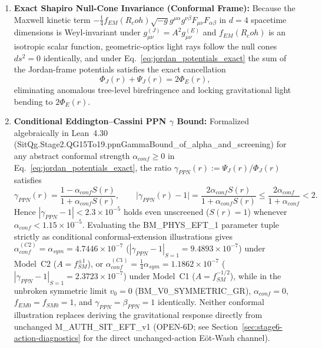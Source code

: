 \documentclass[american,11pt,letterpaper]{article}
\newcommand{\Rcoh}{R_{\mathrm{coh}}}
\def\mathrm#1{#1}%
\def\texttt#1{#1}%
\def\Rcoh{R_coh}%
\begin{document}
\begin{enumerate}[leftmargin=2em]
  \item \textbf{Exact Shapiro Null-Cone Invariance (Conformal Frame):} Because the Maxwell kinetic term $-\frac{1}{4}f_{\mathrm{EM}}(\Rcoh)\sqrt{-g}g^{\mu\alpha}g^{\nu\beta}F_{\mu\nu}F_{\alpha\beta}$ in $d=4$ spacetime dimensions is Weyl-invariant under $g_{\mu\nu}^{(J)} = A^2 g_{\mu\nu}^{(E)}$ and $f_{\mathrm{EM}}(\Rcoh)$ is an isotropic scalar function, geometric-optics light rays follow the null cones $ds^2 = 0$ identically, and under Eq.~\eqref{eq:jordan_potentials_exact} the sum of the Jordan-frame potentials satisfies the exact cancellation
  \begin{equation}
  \Phi_J(r) + \Psi_J(r) = 2\Phi_E(r),
  \label{eq:shapiro_null_cone_invariance}
  \end{equation}
  eliminating anomalous tree-level birefringence and locking gravitational light bending to $2\Phi_E(r)$.
  \item \textbf{Conditional Eddington--Cassini PPN $\gamma$ Bound:} Formalized algebraically in Lean~4.30 (\texttt{SitQg.Stage2.QG15To19.ppnGammaBound\_of\_alpha\_and\_screening}) for any abstract conformal strength $\alpha_{\mathrm{conf}} \ge 0$ in Eq.~\eqref{eq:jordan_potentials_exact}, the ratio $\gamma_{\mathrm{PPN}}(r) := \Psi_J(r)/\Phi_J(r)$ satisfies
  \begin{equation}
  \gamma_{\mathrm{PPN}}(r) = \frac{1 - \alpha_{\mathrm{conf}} S(r)}{1 + \alpha_{\mathrm{conf}} S(r)},
  \qquad
  \bigl|\gamma_{\mathrm{PPN}}(r) - 1\bigr|
  = \frac{2\alpha_{\mathrm{conf}} S(r)}{1 + \alpha_{\mathrm{conf}} S(r)}
  \le \frac{2\alpha_{\mathrm{conf}}}{1 + \alpha_{\mathrm{conf}}} < 2.
  \label{eq:gamma_ppn_exact_bound}
  \end{equation}
  Hence $|\gamma_{\mathrm{PPN}} - 1| < 2.3 \times 10^{-5}$ holds even unscreened ($S(r) = 1$) whenever $\alpha_{\mathrm{conf}} < 1.15 \times 10^{-5}$. Evaluating the \texttt{BM\_PHYS\_EFT\_1} parameter tuple strictly as conditional conformal-extension illustrations gives $\alpha_{\mathrm{conf}}^{(\mathrm{C2})} = \alpha_{\mathrm{sym}} = 4.7446\times 10^{-7}$ ($|\gamma_{\mathrm{PPN}}-1|_{S=1} = 9.4893\times 10^{-7}$) under Model~C2 ($A = f_{\mathrm{SM}}^{\pm 1}$), or $\alpha_{\mathrm{conf}}^{(\mathrm{C1})} = \frac{1}{4}\alpha_{\mathrm{sym}} = 1.1862\times 10^{-7}$ ($|\gamma_{\mathrm{PPN}}-1|_{S=1} = 2.3723\times 10^{-7}$) under Model~C1 ($A = f_{\mathrm{SM}}^{-1/2}$), while in the unbroken symmetric limit $v_0 = 0$ (\texttt{BM\_V0\_SYMMETRIC\_GR}), $\alpha_{\mathrm{conf}} = 0$, $f_{\mathrm{EM}0} = f_{\mathrm{SM}0} = 1$, and $\gamma_{\mathrm{PPN}} = \beta_{\mathrm{PPN}} = 1$ identically. Neither conformal illustration replaces deriving the gravitational response directly from unchanged \texttt{M\_AUTH\_SIT\_EFT\_v1} (\texttt{OPEN-6D}; see Section~\ref{sec:stage6-action-diagnostics} for the direct unchanged-action E\"ot-Wash channel).
\end{enumerate}
\end{document}
